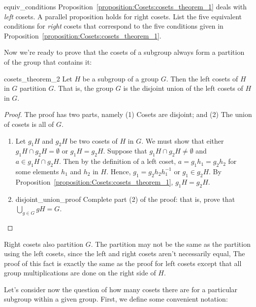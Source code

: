 \begin{exercise}{equiv_conditions}
Proposition~\ref{proposition:Cosets:cosets_theorem_1} deals with \emph{left} cosets. A parallel proposition holds for right cosets. List the five equivalent conditions for \emph{right} cosets that correspond to the five conditions given in Proposition~\ref{proposition:Cosets:cosets_theorem_1}.
\end{exercise}

Now we're ready to prove that the cosets of a subgroup always form a partition of the group that contains it:

\begin{prop}{cosets_theorem_2}
Let $H$ be a subgroup of a group $G$.  Then the left cosets of $H$ in $G$ partition $G$.  That is, the group $G$ is the disjoint union of the left cosets of $H$ in $G$. 
\end{prop}

\begin{proof}
The proof has two parts, namely  (1) Cosets are disjoint; and (2) The union of cosets is all of $G$.
\begin{enumerate}[(1)]
\item
Let $g_1 H$ and $g_2 H$ be two cosets of $H$ in $G$.  We must show that either $g_1 H \cap g_2 H = \emptyset$ or $g_1 H = g_2 H$.  Suppose that $g_1 H \cap g_2 H \neq \emptyset$ and $a \in g_1 H \cap g_2 H$.  Then by the definition of a left coset, $a = g_1 h_1 = g_2 h_2$ for some elements $h_1$ and $h_2$ in $H$.  Hence, $g_1 = g_2 h_2 h_1^{-1}$ or $g_1 \in g_2 H$.  By Proposition~\ref{proposition:Cosets:cosets_theorem_1}, $g_1 H = g_2 H$. 
\item
\begin{exercise}{disjoint_union_proof}
Complete part (2) of the proof: that is, prove that $\bigcup_{g \in G} g H = G$.
\end{exercise}
\end{enumerate}
\end{proof}

\begin{rem}\label{right_is_left}
Right cosets also partition $G$. The partition may not be the same as the partition using the left cosets, since the left and right cosets aren't necessarily equal, 
The proof of this fact is exactly the same as the proof for left cosets except that all group multiplications are done on the right side of $H$.
\end{rem} 

Let's consider now the question of how many cosets there are for a particular subgroup within a given group. First, we define some convenient notation:

